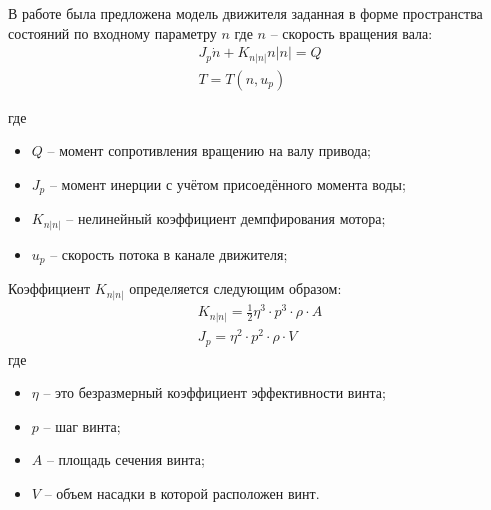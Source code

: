 В работе \cite{10.1109/48.107145} была предложена модель движителя заданная в форме пространства состояний по входному параметру $n$ где $n$ -- скорость вращения вала:
\begin{equation}
    \label{eq:thruster_dynamic_1}
    \begin{array}{c}
        J_p\dot{n} + K_{n|n|}n|n| = Q \\
        T = T(n, u_p)
    \end{array}
\end{equation}

\noindent где
\begin{itemize}
    \item $Q$ -- момент сопротивления вращению на валу привода;
    \item $J_p$ -- момент инерции с учётом присоедённого момента воды;
    \item $K_{n|n|}$ -- нелинейный коэффициент демпфирования мотора;
    \item $u_p$ -- скорость потока в канале движителя;
\end{itemize}




Коэффициент $K_{n|n|}$ определяется следующим образом:
\begin{gather*}
    K_{n|n|} = \frac{1}{2}\eta^3 \cdot p^3 \cdot \rho \cdot A \\
    J_p = \eta^2 \cdot p^2 \cdot \rho \cdot V
\end{gather*}
\noindent где
\begin{itemize}
    \item $\eta$ -- это безразмерный коэффициент эффективности винта;
    \item $p$ -- шаг винта;
    \item $A$ -- площадь сечения винта;
    \item $V$ -- объем насадки в которой расположен винт.
\end{itemize}

